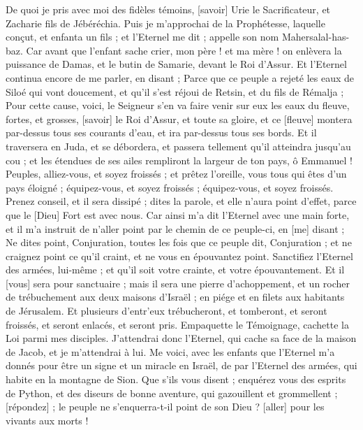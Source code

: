 \begin{multicols}{2}
De quoi je pris avec moi des fidèles témoins, [savoir] Urie le Sacrificateur, et Zacharie fils de Jébéréchia.
Puis je m'approchai de la Prophétesse, laquelle conçut, et enfanta un fils ; et l'Eternel me dit ; appelle son nom Mahersalal-has-baz.
Car avant que l'enfant sache crier, mon père ! et ma mère ! on enlèvera la puissance de Damas, et le butin de Samarie, devant le Roi d'Assur.
Et l'Eternel continua encore de me parler, en disant ;
Parce que ce peuple a rejeté les eaux de Siloé qui vont doucement, et qu'il s'est réjoui de Retsin, et du fils de Rémalja ;
Pour cette cause, voici, le Seigneur s'en va faire venir sur eux les eaux du fleuve, fortes, et grosses, [savoir] le Roi d'Assur, et toute sa gloire, et ce [fleuve] montera par-dessus tous ses courants d'eau, et ira par-dessus tous ses bords.
Et il traversera en Juda, et se débordera, et passera tellement qu'il atteindra jusqu'au cou ; et les étendues de ses ailes rempliront la largeur de ton pays, ô Emmanuel !
Peuples, alliez-vous, et soyez froissés ; et prêtez l'oreille, vous tous qui êtes d'un pays éloigné ; équipez-vous, et soyez froissés ; équipez-vous, et soyez froissés.
Prenez conseil, et il sera dissipé ; dites la parole, et elle n'aura point d'effet, parce que le [Dieu] Fort est avec nous.
Car ainsi m'a dit l'Eternel avec une main forte, et il m'a instruit de n'aller point par le chemin de ce peuple-ci, en [me] disant ;
Ne dites point, Conjuration, toutes les fois que ce peuple dit, Conjuration ; et ne craignez point ce qu'il craint, et ne vous en épouvantez point.
Sanctifiez l'Eternel des armées, lui-même ; et qu'il soit votre crainte, et votre épouvantement.
Et il [vous] sera pour sanctuaire ; mais il sera une pierre d'achoppement, et un rocher de trébuchement aux deux maisons d'Israël ; en piége et en filets aux habitants de Jérusalem.
Et plusieurs d'entr'eux trébucheront, et tomberont, et seront froissés, et seront enlacés, et seront pris.
Empaquette le Témoignage, cachette la Loi parmi mes disciples.
J'attendrai donc l'Eternel, qui cache sa face de la maison de Jacob, et je m'attendrai à lui.
Me voici, avec les enfants que l'Eternel m'a donnés pour être un signe et un miracle en Israël, de par l'Eternel des armées, qui habite en la montagne de Sion.
Que s'ils vous disent ; enquérez vous des esprits de Python, et des diseurs de bonne aventure, qui gazouillent et grommellent ; [répondez] ; le peuple ne s'enquerra-t-il point de son Dieu ? [aller] pour les vivants aux morts !

\end{multicols}
